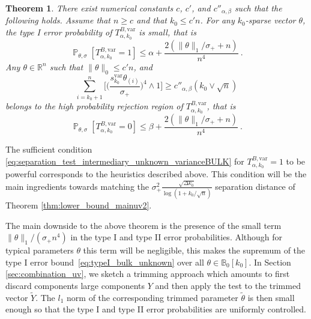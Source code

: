 \documentclass[twoside,11pt]{article}
\newtheorem{thm}{Theorem}
\def\beq{\begin{equation}}
\def\eeq{\end{equation}}
\def\bbB{\mathbb{B}}
\renewcommand{\P}{\operatorname{\mathbb{P}}}
\newcommand{\<}{\langle}
\renewcommand{\>}{\rangle}
\begin{document}
\begin{thm}\label{thm:bulk_unknown}
There exist numerical constants $c$, $c'$, and $c''_{\alpha,\beta}$ such that the following holds. Assume that $n\geq c$ and that $k_0\leq c' n$.  
For any $k_0$-sparse vector $\theta$, the type I error probability of $T^{B,\mathrm{var}}_{\alpha,k_0}$ is small, that is 
\beq\label{eq:typeI_bulk_unknown}
 \P_{\theta,\sigma}[T^{B,\mathrm{var}}_{\alpha,k_0}=1]\leq \alpha + \frac{2(\|\theta\|_1/\sigma_++ n)}{n^4}\ . 
\eeq
Any $\theta\in \mathbb{R}^n$ such that $\|\theta\|_0\leq c'n$,  and 
\beq\label{eq:separation_test_intermediary_unknown_varianceBULK}
\sum_{i=k_0+1}^{n} \big[\big(\frac{s_{k_0}^{\mathrm{var}} \theta_{(i)}}{\sigma_+}\big)^4\wedge 1\big] \geq  c{''}_{\alpha,\beta} (k_0\vee \sqrt{n})
\eeq 
belongs to the high probability rejection region of $T^{B,\mathrm{var}}_{\alpha,k_0}$, that is 
\[
\P_{\theta,\sigma}[T^{B,\mathrm{var}}_{\alpha,k_0}=0]\leq \beta+   \frac{2(\|\theta\|_1/\sigma_++ n)}{n^4} \ .
\]
\end{thm}

The sufficient condition \eqref{eq:separation_test_intermediary_unknown_varianceBULK} for $T^{B,\mathrm{var}}_{\alpha,k_0}=1$ to be powerful corresponds to the heuristics described above. This condition will be the main ingredients towards matching the $ \sigma_+^2\tfrac{\sqrt{\Delta k_0}}{\log(1+ k_0/\sqrt{n})}$ separation distance of Theorem \ref{thm:lower_bound_mainuv2}. 


The main downside to the above theorem is the presence of the small term $\|\theta\|_1/(\sigma_+n^4)$ in the type I and type II error probabilities. Although for typical parameters $\theta$ this term will be negligible, this makes the supremum of the type I error bound~\eqref{eq:typeI_bulk_unknown} over all $\theta\in \bbB_0[k_0]$. In Section \ref{sec:combination_uv}, we sketch a trimming approach which amounts to first discard components large components $Y$ 
and then apply the test to the trimmed vector  $\tilde{Y}$. The $l_1$ norm of the corresponding trimmed parameter $\tilde{\theta}$ is then small enough so that the type I and type II error probabilities are uniformly controlled. 










\end{document}
